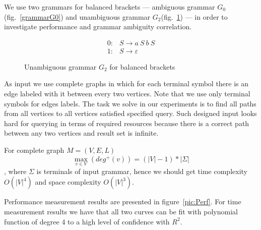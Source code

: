 We use two grammars for balanced brackets --- ambiguous grammar $G_0$(fig.~\ref{grammarG0}) and unambiguous grammar $G_2$(fig.~\ref{grammarG2}) --- in order to investigate performance and grammar ambiguity correlation.

\begin{figure}[ht]
   \begin{center}
   \[
\begin{array}{rl}
   0: & S \rightarrow a \ S \ b \ S \\ 
   1: & S \rightarrow \varepsilon
\end{array}
\]
   \caption{Unambiguous grammar $G_2$ for balanced brackets}
   \label{grammarG2}        
   \end{center}
\end{figure}

As input we use complete graphs in which for each terminal symbol there is an edge labeled with it between every two vertices.
Note that we use only terminal symbols for edges labels.  
The task we solve in our experiments is to find all paths from all vertices to all vertices satisfied specified query.
Such designed input looks hard for querying in terms of required resources because there is a correct path between any two vertices and result set is infinite.

For complete graph $M=(V,E,L)$ $$\max\limits_{v \in V}\left(deg^+\left(v\right)\right) = (|V| - 1)*|\Sigma|$$, where $\Sigma$ is terminals of input grammar, hence we should get time complexity $O(|V|^4)$ and space complexity $O(|V|^3)$.

Performance measurement results are presented in figure~\ref{pic:Perf}. 
For time measurement results we have that all two curves can be fit with polynomial function of degree 4 to a high level of confidence with $R^2$. 


